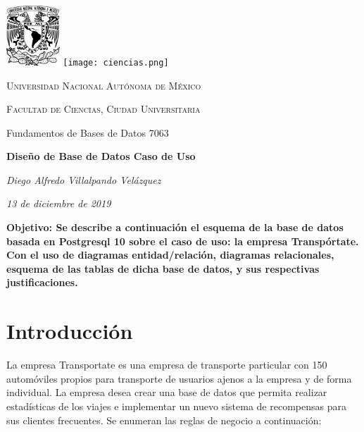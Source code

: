 \documentclass{article}
\begin{document}

{\centering 
\noindent\hrulefill \par \vspace{0.5cm}
\includegraphics[width=2cm]{unam.png} \hspace{11.5cm}
\texttt{[image: ciencias.png]}\vspace{-2.2cm}
     {\scshape\Large Universidad Nacional Autónoma de México \par}
     {\scshape\Large Facultad de Ciencias, Ciudad Universitaria \par}
     {\Large Fundamentos de Bases de Datos 7063\par}
     \vspace{0.2cm}
     {\Large\bfseries Diseño de Base de Datos Caso de Uso \par}
     \vspace{0.2cm}
     {\large\itshape Diego Alfredo Villalpando Velázquez \par \vspace{0.2cm}}
     {\large\itshape 13 de diciembre de 2019\par} \vspace{0.35cm}
     \noindent\hrulefill
}

\vspace{0.5cm}
       { \bfseries
         Objetivo:
         Se describe a continuación el esquema de la base de datos basada en Postgresql 10
         sobre el caso de uso: la empresa Transpórtate. Con el uso de diagramas
         entidad/relación, diagramas relacionales, esquema de las tablas de dicha base de
         datos, y sus respectivas justificaciones.
       }
       
       \noindent \tableofcontents
       
       \newpage
       \section{Introducción}
               {
                 La empresa Transportate es una empresa de transporte particular con 150 automóviles
                 propios para transporte de usuarios ajenos a la empresa y de forma individual. La
                 empresa desea crear una base de datos que permita realizar estadísticas
                 de los viajes e implementar un nuevo sistema de recompensas para sus clientes
                 frecuentes. Se enumeran las reglas de negocio a continuación:
               }
               
\end{document}
